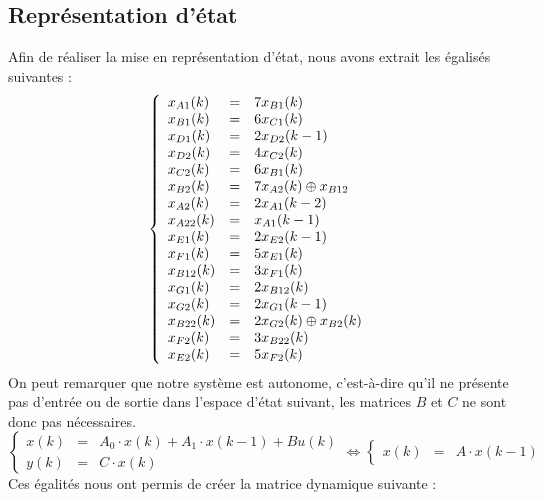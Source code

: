\subsection{Représentation d'état}
Afin de réaliser la mise en représentation d'état, nous avons extrait les égalisés suivantes :
\begin{equation}
\label{equ:ee1}
\left\lbrace
\begin{array}{l c l}
x_{A1}(k) &=&	7x_{B1}(k)\\ 
x_{B1}(k) &=&	6x_{C1}(k)\\
x_{D1}(k) &=&	2x_{D2}(k-1)\\
x_{D2}(k) &=&	4x_{C2}(k)\\
x_{C2}(k) &=&	6x_{B1}(k)\\
x_{B2}(k) &=&	7x_{A2}(k) \oplus x_{B12}\\
x_{A2}(k) &=&	2x_{A1}(k-2)\\
x_{A22}(k) &=&	x_{A1}(k-1)\\
x_{E1}(k) &=&	2x_{E2}(k-1)\\
x_{F1}(k) &=&	5x_{E1}(k)\\
x_{B12}(k) &=&	3x_{F1}(k)\\
x_{G1}(k) &=&	2x_{B12}(k)\\
x_{G2}(k) &=&	2x_{G1}(k-1)\\
x_{B22}(k) &=&	2x_{G2}(k) \oplus x_{B2}(k)\\
x_{F2}(k) &=&	3x_{B22}(k)\\
x_{E2}(k) &=&	5x_{F2}(k)   \\  
\end{array}
\right.
\end{equation}
On peut remarquer que notre système est autonome, c'est-à-dire qu'il ne présente pas d'entrée ou de sortie 
dans l'espace d'état suivant, les matrices $B$ et $C$ ne sont donc pas nécessaires.
\begin{equation}
\left\lbrace
\begin{array}{lcl}
	x(k) &=& A_0 \cdot x(k) + A_1 \cdot x(k-1) + B u(k)\\
	y(k) &=& C \cdot x(k)
\end{array}
\right. \Leftrightarrow
\left\lbrace\begin{array}{lcl}
	x(k) &=& A \cdot x(k-1)
\end{array}\right.
\end{equation}
Ces égalités nous ont permis de créer la matrice dynamique suivante : 
